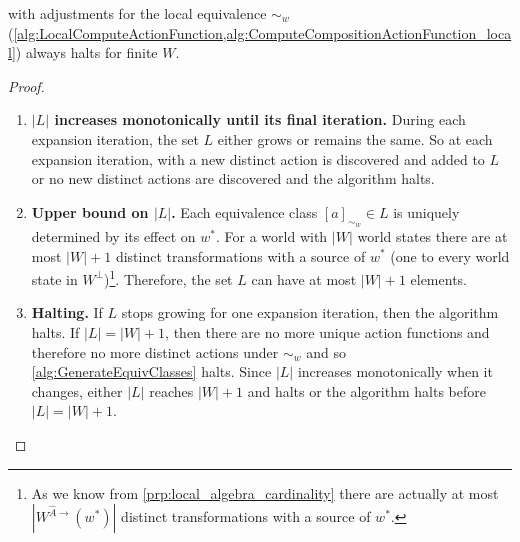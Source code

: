 \begin{proposition}
     with adjustments for the local equivalence $\sim_{w}$ (\cref{alg:LocalComputeActionFunction,alg:ComputeCompositionActionFunction_local}) always halts for finite $W$.
\end{proposition}
\begin{proof}
\begin{enumerate}[(1)]
    \item \textbf{$|L|$ increases monotonically until its final iteration.}
    During each expansion iteration, the set $L$ either grows or remains the same.
    So at each expansion iteration, with a new distinct action is discovered and added to $L$ or no new distinct actions are discovered and the algorithm halts.

    \item \textbf{Upper bound on $|L|$.}
    Each equivalence class $[a]_{\sim_{w}} \in L$ is uniquely determined by its effect on $w^{*}$.
    For a world with $|W|$ world states there are at most $|W| + 1$ distinct transformations with a source of $w^{*}$ (one to every world state in $W^{\bot}$)\footnote{
    As we know from \cref{prp:local_algebra_cardinality} there are actually at most $|W^{\hat{A}\to}(w^{*})|$ distinct transformations with a source of $w^{*}$.
    }.
    Therefore, the set $L$ can have at most $|W|+1$ elements.

    \item \textbf{Halting.}
    If $L$ stops growing for one expansion iteration, then the algorithm halts.
    If $|L| = |W|+1$, then there are no more unique action functions and therefore no more distinct actions under $\sim_{w}$ and so \cref{alg:GenerateEquivClasses} halts.
    Since $|L|$ increases monotonically when it changes, either $|L|$ reaches $|W|+1$ and halts or the algorithm halts before $|L|=|W|+1$.
\end{enumerate}
\end{proof}

